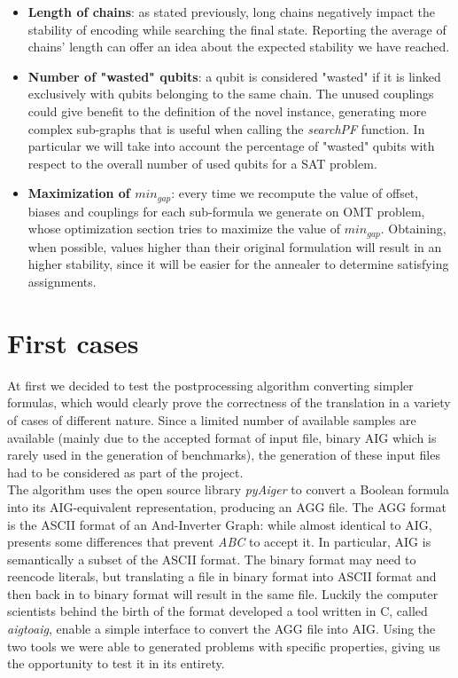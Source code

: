 \begin{itemize}
    \item \textbf{Length of chains}: as stated previously, long chains negatively impact the stability of encoding while searching the final state. Reporting the average of chains' length can offer an idea about the expected stability we have reached.
    \item \textbf{Number of "wasted" qubits}: a qubit is considered "wasted" if it is linked exclusively with qubits belonging to the same chain. The unused couplings could give benefit to the definition of the novel instance, generating more complex sub-graphs that is useful when calling the \textit{searchPF} function. In particular we will take into account the percentage of "wasted" qubits with respect to the overall number of used qubits for a SAT problem.
    \item \textbf{Maximization of $min_{gap}$}: every time we recompute the value of offset, biases and couplings for each sub-formula we generate on OMT problem, whose optimization section tries to maximize the value of $min_{gap}$. Obtaining, when possible, values higher than their original formulation will result in an higher stability, since it will be easier for the annealer to determine satisfying assignments.
\end{itemize}

\section{First cases}

At first we decided to test the postprocessing algorithm converting simpler formulas, which would clearly prove the correctness of the translation in a variety of cases of different nature. Since a limited number of available samples are available (mainly due to the accepted format of input file, binary AIG which is rarely used in the generation of benchmarks), the generation of these input files had to be considered as part of the project. \\
The algorithm uses the open source library \textit{pyAiger} \cite{pyaiger} to convert a Boolean formula into its AIG-equivalent representation, producing an AGG file. The AGG format is the ASCII format of an And-Inverter Graph: while almost identical to AIG, presents some differences that prevent \textit{ABC} to accept it. In particular, AIG is semantically a subset of the ASCII format. The binary format may need to reencode literals, but translating a file in binary format into ASCII format and   then back in to binary format will result in the same file. Luckily the computer scientists behind the birth of the format developed a tool written in C, called \textit{aigtoaig}, enable a simple interface to convert the AGG file into AIG. Using the two tools we were able to generated problems with specific properties, giving us the opportunity to test it in its entirety. 

